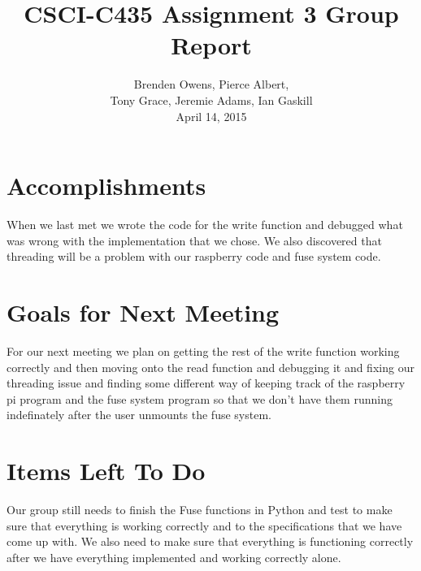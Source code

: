\documentclass[12pt, letterpaper, notitlepage]{paper}
\title{CSCI-C435 Assignment 3 Group Report}
\author{Brenden Owens, Pierce Albert, \\
Tony Grace, Jeremie Adams, Ian Gaskill
\\April 14, 2015}
\begin{document}
\maketitle

\section{Accomplishments}
When we last met we wrote the code for the write function and debugged what was wrong with the implementation that we chose. We also discovered that threading will be a problem with our raspberry code and fuse system code. 
\section{Goals for Next Meeting}
For our next meeting we plan on getting the rest of the write function working correctly and then moving onto the read function and debugging it and fixing our threading issue and finding some different way of keeping track of the raspberry pi program and the fuse system program so that we don't have them running indefinately after the user unmounts the fuse system.
\section{Items Left To Do}
Our group still needs to finish the Fuse functions in Python and test to make sure that everything is working correctly and to the specifications that we have come up with. We also need to make sure that everything is functioning correctly after we have everything implemented and working correctly alone. 
\end{document}
